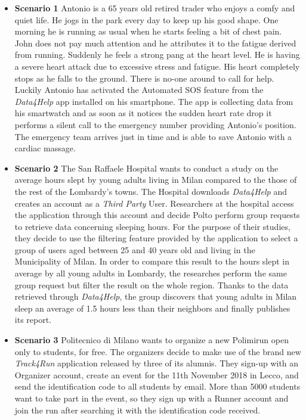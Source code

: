 \documentclass[titlepage]{article}
\begin{document}
				\begin{itemize}
					\item {\bf Scenario 1} \linebreak
					Antonio is a 65 years old retired trader who enjoys a comfy and quiet life. 
					He jogs in the park every day to keep up his good shape. One morning he is running as usual when 					he starts feeling a bit of chest pain. John does not pay much attention and he attributes it to the 					fatigue derived from running. Suddenly he feels a strong pang at the heart level. He is having a 					severe heart attack due to excessive stress and fatigue. His heart completely stops as he falls to 					the ground. There is no-one around to call for help. Luckily Antonio has activated the Automated 					SOS feature from the {\it Data4Help} app installed on his smartphone. The app is collecting data from 					his smartwatch and as soon as it notices the sudden heart rate drop it performs a silent call to the 					emergency number providing Antonio’s position. The emergency team arrives just in time and is 					able to save Antonio with a cardiac massage.
					\item {\bf Scenario 2} \linebreak
					The San Raffaele Hospital wants to conduct a study on the average hours slept by young adults 					living in Milan compared to the those of the rest of the Lombardy’s towns. The Hospital downloads 					{\it Data4Help} and creates an account as a {\it Third Party} User. Researchers at the hospital access the 					application through this account  and decide Polto perform group requests to retrieve data 						concerning sleeping hours. 
					For the purpose of their studies, they decide to use the filtering feature provided by the application 					to select a group of users aged between 25 and 40 years old and living in the Municipality of Milan. 					In order to compare this result to the hours slept in average by all young adults in Lombardy, the 					researches perform the same group request but filter the result on the whole region. 
					Thanks to the data retrieved through {\it Data4Help}, the group discovers that young adults in Milan 					sleep an average of 1.5 hours less than their neighbors and finally publishes its report.
					\item {\bf Scenario 3} \linebreak
					Politecnico di Milano wants to organize a new Polimirun open only to students, for free. The 						organizers decide to make use of the brand new {\it Track4Run} application released by three of its 					alumnis. They sign-up with an Organizer account, create an event for the 11th November 2018 in 					Lecco, and send the identification code to all students by email. More than 5000 students want to 					take part in the event, so they sign up with a Runner account and join the run after searching it with 					the identification code received.

\end{itemize}
\end{document}

